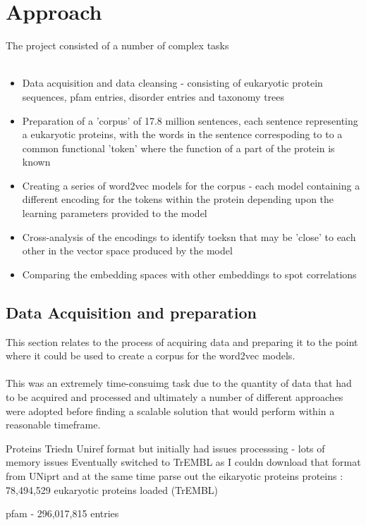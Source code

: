 \documentclass{article}
\begin{document}
\section{Approach}
The project consisted of a number of complex tasks
\\\\
\begin{itemize}
    \item Data acquisition and data cleansing - consisting of eukaryotic protein sequences, pfam entries, disorder entries and taxonomy trees
    \item Preparation of a 'corpus' of 17.8 million sentences, each sentence representing a eukaryotic proteins, with the words in the sentence correspoding to to a common functional 'token' where the function of a part of the protein is known 
    \item Creating a series of word2vec models for the corpus - each model containing a different encoding for the tokens within the protein depending upon the learning parameters provided to the model
    \item Cross-analysis of the encodings to identify toeksn that may be 'close' to each other in the vector space produced by the model
    \item Comparing the embedding spaces with other embeddings to spot correlations
\end{itemize}

\subsection{Data Acquisition and preparation}
This section relates to the process of acquiring data and preparing it to the point where it could be used to create a corpus for the word2vec models. 
\\\\
This was an extremely time-consuimg task due to the quantity of data that had to be acquired and processed and ultimately a number of different approaches were adopted before finding a scalable solution that would perform within a reasonable timeframe.

Proteins
Triedn Uniref format but initially had issues processsing - lots of memory issues
Eventually switched to TrEMBL as I couldn download that format from UNiprt and at the same time parse out the eikaryotic proteins
proteins : 78,494,529 eukaryotic proteins loaded (TrEMBL)

pfam - 296,017,815 entries
\end{document}
